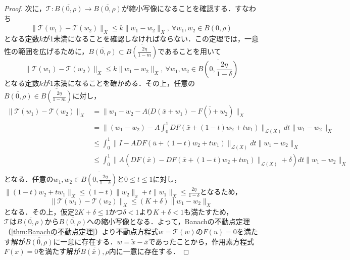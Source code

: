 \documentclass[11pt,a4paper]{jsarticle}
\theoremstyle{definition}
\begin{document}
\begin{proof}
  次に，$\mathcal{T}:\overline{B(0,\rho)}\rightarrow \overline{B(0,\rho)}$が縮小写像になることを確認する．すなわち
  \begin{equation*}
    \|\mathcal{T}(w_1) - \mathcal{T} (w_2)\|_X \leq k \|w_1-w_2\|_X,\ \forall w_1,w_2\in \overline{B(0,\rho)}
  \end{equation*}
  となる定数$k$が1未満になることを確認しなければならない．この定理では，一意性の範囲を広げるために，$\overline{B(0,\rho)}\subset \overline{B\left(\frac{2\eta}{1-m}\right)}$であることを用いて
  \begin{equation*}
    \|\mathcal{T}(w_1) - \mathcal{T} (w_2)\|_X \leq k \|w_1-w_2\|_X,\ \forall w_1,w_2\in \overline{B\left(0,\frac{2\eta}{1-\delta}\right)}
  \end{equation*}
  となる定数$k$が$1$未満になることを確かめる．その上，任意の$\overline{B(0,\rho)}\in\overline{B\left(\frac{2\eta}{1-m}\right)}$に対し，
  \begin{align*}
    \|\mathcal{T}(w_1) - \mathcal{T} (w_2)\|_X & = \|w_1-w_2-A(D(\bar{x}+w_1)-F(\bar)+w_2)\|_X                                                         \\
                                               & = \|(w_1-w_2)-A\int_{0}^{1}DF(\bar{x}+(1-t)w_2+tw_1)\|_{\mathcal{L}(X)}dt\|w_1-w_2\|_X                \\
                                               & \leq \int_{0}^{1} \|I-ADF(\bar{u}+(1-t)w_2+tw_1)\|_{\mathcal{L}(X)}dt\|w_1-w_2\|_X                    \\
                                               & \leq \int_{0}^{1} \|A(DF(\bar{x})-DF(\bar{x}+(1-t)w_2+tw_1)\|_{\mathcal{L}(X)}+\delta)dt\|w_1-w_2\|_X \\
  \end{align*}
  となる．任意の$w_1,w_2\in\overline{B\left(0,\frac{2\eta}{1-\delta}\right)}$と$0\leq t \leq 1$に対し，$\|(1-t)w_2+tw_1\|_X\leq(1-t)\|w_2\|_x+t\|w_1\|_X\leq \frac{2\eta}{1-\delta}$となるため，
  \begin{equation*}
    \|\mathcal{T}(w_1) - \mathcal{T} (w_2)\|_X \leq (K+\delta)\|w_1-w_2\|_X
  \end{equation*}
  となる．その上，仮定$2K+\delta\leq 1かつ\delta<1$より$K+\delta < 1$も満たすため，$\mathcal{T}は\overline{B(0,\rho)}から\overline{B(0,\rho)}$への縮小写像となる．よって，Banachの不動点定理（\ref{thm:Banachの不動点定理}）より不動点方程式$w=\mathcal{T}(w)$の$F(u)=0$を満たす解が$\overline{B(0,\rho)}$に一意に存在する．$w=\tilde{x}-\bar{x}$であったことから，作用素方程式$F(x)=0$を満たす解が$\overline{B(\bar{x}),\rho}$内に一意に存在する．


\end{proof}
\end{document}
